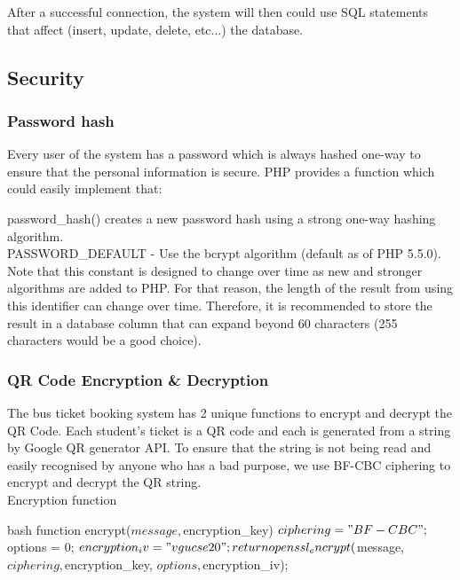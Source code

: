 After a successful connection, the system will then could use SQL statements that affect (insert, update, delete, etc...) the database.

\subsection{Security}

\subsubsection{Password hash}
\noindent Every user of the system has a password which is always hashed one-way to ensure that the personal information is secure. PHP provides a function which could easily implement that:

\noindent password\_hash() creates a new password hash using a strong one-way hashing algorithm. \\

\noindent PASSWORD\_DEFAULT - Use the bcrypt algorithm (default as of PHP 5.5.0). Note that this constant is designed to change over time as new and stronger algorithms are added to PHP. For that reason, the length of the result from using this identifier can change over time. Therefore, it is recommended to store the result in a database column that can expand beyond 60 characters (255 characters would be a good choice).

\subsubsection{QR Code Encryption \& Decryption}
\noindent The bus ticket booking system has 2 unique functions to encrypt and decrypt the QR Code.
\noindent Each student's ticket is a QR code and each is generated from a string by Google QR generator API. To ensure that the string is not being read and easily recognised by anyone who has a bad purpose, we use BF-CBC ciphering to encrypt and decrypt the QR string. \\

Encryption function
    \begin{code}{bash}
        function encrypt($message, $encryption_key){
            $ciphering = "BF-CBC";
            $options = 0;
            $encryption_iv = "vgucse20";
        
            return openssl_encrypt($message, $ciphering, $encryption_key, $options, $encryption_iv);
        }
    \end{code}


